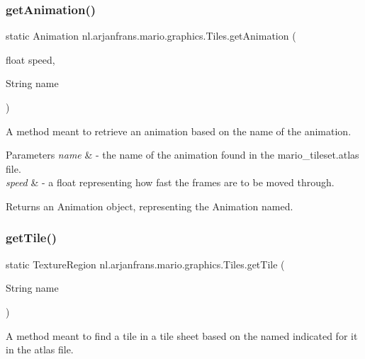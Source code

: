\subsubsection{\texorpdfstring{get\+Animation()}{getAnimation()}}
{\footnotesize\ttfamily static Animation nl.\+arjanfrans.\+mario.\+graphics.\+Tiles.\+get\+Animation (\begin{DoxyParamCaption}\item[{float}]{speed,  }\item[{String}]{name }\end{DoxyParamCaption})\hspace{0.3cm}{\ttfamily [static]}}



A method meant to retrieve an animation based on the name of the animation. 


\begin{DoxyParams}{Parameters}
{\em name} & -\/ the name of the animation found in the mario\+\_\+tileset.\+atlas file. \\
\hline
{\em speed} & -\/ a float representing how fast the frames are to be moved through. \\
\hline
\end{DoxyParams}
\begin{DoxyReturn}{Returns}
an Animation object, representing the Animation named. 
\end{DoxyReturn}
\mbox{\label{classnl_1_1arjanfrans_1_1mario_1_1graphics_1_1Tiles_a33e1805fc683bac7f3883119857486eb}} 
\subsubsection{\texorpdfstring{get\+Tile()}{getTile()}}
{\footnotesize\ttfamily static Texture\+Region nl.\+arjanfrans.\+mario.\+graphics.\+Tiles.\+get\+Tile (\begin{DoxyParamCaption}\item[{String}]{name }\end{DoxyParamCaption})\hspace{0.3cm}{\ttfamily [static]}}



A method meant to find a tile in a tile sheet based on the named indicated for it in the atlas file. 


